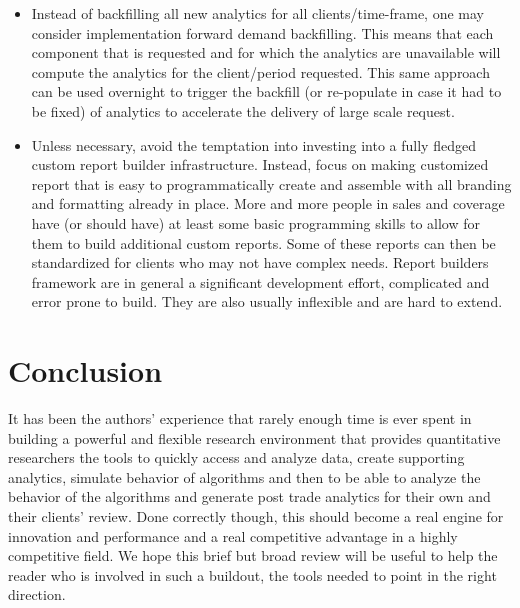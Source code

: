 \begin{itemize}
\item Instead of backfilling all new analytics for all clients/time-frame, one may consider implementation forward demand backfilling. This means that each component that is requested and for which the analytics are unavailable will compute the analytics for the client/period requested. This same approach can be used overnight to trigger the backfill  (or re-populate in case it had to be fixed) of analytics to accelerate the delivery of large scale request.

\item Unless necessary, avoid the temptation into investing into a fully fledged custom report builder infrastructure. Instead, focus on making customized report that is easy to programmatically create and assemble with all branding and formatting already in place. More and more people in sales and coverage have (or should have) at least some basic programming skills to allow for them to build additional custom reports. Some of these reports can then be standardized for clients who may not have complex needs. Report builders framework are in general a significant development effort, complicated and error prone to build. They are also usually inflexible and are hard to extend. 
\end{itemize}

 

\section{Conclusion}

It has been the authors' experience that rarely enough time is ever spent in building a powerful and flexible research environment that provides quantitative researchers the tools to quickly access and analyze data, create supporting analytics, simulate behavior of algorithms and then to be able to analyze the behavior of the algorithms and generate post trade analytics for their own and their clients' review. Done correctly though, this should become a real engine for innovation and performance and a real competitive advantage in a highly competitive field. We hope this brief but broad review will be useful to help the reader who is involved in such a buildout, the tools needed to point in the right direction.